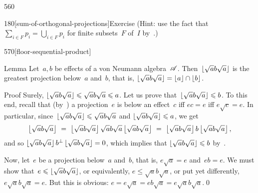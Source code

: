 \begin{parsec}{560}
\begin{point}{180}[sum-of-orthogonal-projections]{Exercise}
(Hint: 
use the fact that $\sum_{i\in F} p_i = \bigcup_{i \in F} p_i$
for finite subsets~$F$ of~$I$ by~.)
\end{point}
\end{parsec}
\begin{parsec}{570}[floor-sequential-product]%
\begin{point}{10}{Lemma}%
Let~$a,b$ be effects of a von Neumann algebra~$\mathscr{A}$.
Then~$\left\lfloor\sqrt{a}b\sqrt{a}\right\rfloor$ is the greatest projection
below~$a$ and~$b$, that is, 
$\left\lfloor\sqrt{a}b\sqrt{a}\right\rfloor=\left\lfloor a\right\rfloor\cap \left\lfloor b\right\rfloor$.
\begin{point}{20}{Proof}%
Surely, $\left\lfloor\sqrt{a}b\sqrt{a}\right\rfloor\leqslant \sqrt{a}b\sqrt{a} \leqslant a$.
Let us prove that~$\left\lfloor\sqrt{a}b\sqrt{a}\right\rfloor\leqslant b$.
To this end,
recall
that (by~)
a projection~$e$ is below an effect~$c$
iff $ec=e$ iff $e\sqrt{c}=e$.
In particular,
since~$\left\lfloor\sqrt{a}b\sqrt{a}\right\rfloor\leqslant \sqrt{a}b\sqrt{a}$ and 
$\left\lfloor\sqrt{a}b\sqrt{a}\right\rfloor\leqslant a$,
we get
\begin{equation*}
\floor{\sqrt{a}b\sqrt{a}}
\ =\ \floor{\sqrt{a}b\sqrt{a}}\sqrt{a}b\sqrt{a}\floor{\sqrt{a}b\sqrt{a}} \ =\ 
\floor{\sqrt{a}b\sqrt{a}}b\floor{\sqrt{a}b\sqrt{a}},
\end{equation*}
and so $\left\lfloor\sqrt{a}b\sqrt{a}\right\rfloor b^\perp\left\lfloor\sqrt{a}b\sqrt{a}\right\rfloor=0$,
which implies that
$\left\lfloor\sqrt{a}b\sqrt{a}\right\rfloor\leqslant b$ by~.
\begin{point}{30}%
Now,
let~$e$ be a projection below~$a$ and~$b$,
that is, $e\sqrt{a}=e$ and~$eb=e$.
We must show that~$e\leqslant \left\lfloor\sqrt{a}b\sqrt{a}\right\rfloor$,
or equivalently, $e\leq \sqrt{a}b\sqrt{a}$,
or put yet differently, $e\sqrt{a}b\sqrt{a}=e$.
But this is obvious: $e=e\sqrt{a}=eb\sqrt{a}=e\sqrt{a}b\sqrt{a}$.\qed
\end{point}
\end{point}
\end{point}
\end{parsec}
